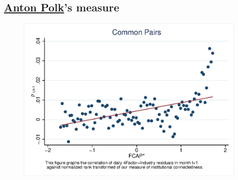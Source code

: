\documentclass[12pt, a4paper]{article}
\begin{document}
\begin{appendices}
\begin{table}[htbp]
\centering
    \resizebox{0.7\textheight}{!}{

}
\end{table}

\FloatBarrier

\section{ \hyperref[a1] 
{Anton Polk}'s measure}
  \begin{figure}   
 \centering
\includegraphics[width=0.75\linewidth]{"mcorr5Polk.eps"}     \end{figure}
\FloatBarrier
\begin{table}[htbp]
\centering
    \resizebox{0.7\textheight}{!}{

}
\end{table}
\FloatBarrier


\end{appendices}


\newpage
\footnotesize{
	
	
}
\end{document}
